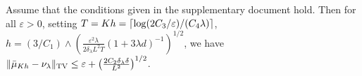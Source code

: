 \begin{cor}
  \label{coro:precision}
  Assume that the conditions given in the supplementary document hold. Then for all $\varepsilon >0$, setting
$T = Kh  = \left\lceil \log(2C_3/\varepsilon)/(C_4\lambda) \right\rceil$, %
$h = (3/C_1)\wedge\left(\frac{\varepsilon^2 \lambda}{2\delta_\lambda L^2 T}(1+3\lambda d)^{-1}\right)^{1/2}$, %
  we have
    $\| \bar{\mu}_{Kh} - \nu_\lambda \|_{\textnormal{TV}} \leq \varepsilon + \left(\frac{2 C_2 \delta_\lambda \delta}{L^2}\right)^{1/2} $. 
\end{cor}

